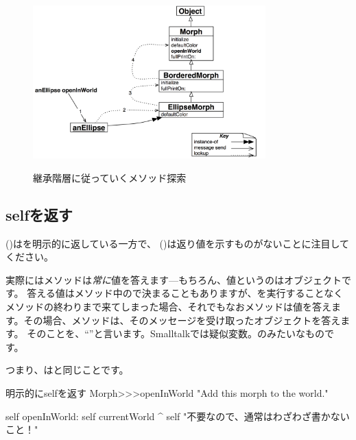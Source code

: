\documentclass[a4paper,10pt,twoside]{book}
\begin{document}
\begin{figure}[htb]
\begin{center}
	{\includegraphics[width=0.8\textwidth]{openInWorldLookup}}
\caption{継承階層に従っていくメソッド探索}
\end{center}
\end{figure}

\subsection{selfを返す}

 ()はを明示的に返している一方で、 ()は返り値を示すものがないことに注目してください。

実際にはメソッドは\emph{常に}値を答えます---もちろん、値というのはオブジェクトです。
答える値はメソッド中の\ct{^}で決まることもありますが、\ct{^}を実行することなくメソッドの終わりまで来てしまった場合、それでもなおメソッドは値を答えます。その場合、メソッドは、そのメッセージを受け取ったオブジェクトを答えます。
そのことを、``''と言います。Smalltalkでは疑似変数。のみたいなものです。

つまり、はと同じことです。

\begin{method}[openInWorldReturnSelf]{明示的にselfを返す}
Morph>>>openInWorld
	"Add this morph to the world."
	
    self openInWorld: self currentWorld
	^ self		"不要なので、通常はわざわざ書かないこと！"
\end{method}
\end{document}

